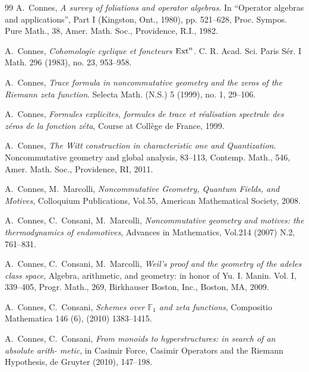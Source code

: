 \documentclass[12pt]{article}
\def\F{{\mathbb F}}
\begin{document}
\begin{thebibliography}{99}
 A.~Connes, {\em A survey of foliations and
operator algebras}. In ``Operator algebras and applications'', Part
I (Kingston, Ont., 1980),  pp. 521--628, Proc. Sympos. Pure Math.,
38, Amer. Math. Soc., Providence, R.I., 1982.

 A.~Connes, {\em  Cohomologie cyclique et foncteurs
${\rm Ext}\sp n$}.  C. R. Acad. Sci. Paris S\'er. I Math. 296
(1983), no. 23, 953--958.





 A.~Connes, {\em Trace formula in noncommutative
geometry and the zeros of the Riemann zeta function}.  Selecta Math.
(N.S.)  5  (1999),  no. 1, 29--106.

 A.~Connes, {\em Formules explicites, formules de trace
et r\'ealisation spectrale des z\'eros de la fonction z\'eta},
Course at Coll\`ege de France, 1999.


 A.~Connes, {\em The Witt construction in characteristic one  and Quantization}. Noncommutative geometry and global analysis, 83--113, Contemp. Math., 546, Amer. Math. Soc., Providence, RI, 2011.

 A.~Connes, M.~Marcolli,  {\em  Noncommutative Geometry, Quantum Fields, and Motives},
Colloquium Publications, Vol.55, American Mathematical Society, 2008.



 A.~Connes, C.~Consani, M.~Marcolli, {\em
Noncommutative geometry and motives: the thermodynamics of
endomotives}, Advances in Mathematics, Vol.214 (2007) N.2, 761--831.

 A.~Connes, C.~Consani, M.~Marcolli, {\em Weil's proof
and the geometry of the adeles class space}, Algebra, arithmetic, and geometry: in honor of Yu. I. Manin. Vol. I, 339--405, Progr. Math., 269, Birkhauser Boston, Inc., Boston, MA, 2009. 



 A.~Connes, C.~Consani, {\em Schemes over $\F_1$ and zeta functions}, Compositio Mathematica
146 (6), (2010) 1383--1415.

 A.~Connes, C.~Consani, {\em From monoids to hyperstructures: in search of an absolute arith-
metic}, in Casimir Force, Casimir Operators and the Riemann Hypothesis, de Gruyter (2010), 147--198.


\end{thebibliography}
\end{document}
